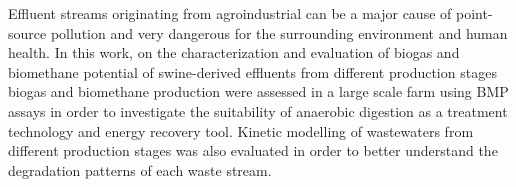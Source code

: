 Effluent streams originating from agroindustrial  can be a major cause of point-source pollution and very dangerous for the surrounding environment and human health. In this work, on the characterization and evaluation of biogas and biomethane potential of swine-derived effluents from different production stages biogas and biomethane production were assessed in a large scale farm using BMP assays in order to investigate the suitability of anaerobic digestion as a treatment technology and energy recovery tool. Kinetic modelling of wastewaters from different production stages was also evaluated in order to better understand the degradation patterns of each waste stream.